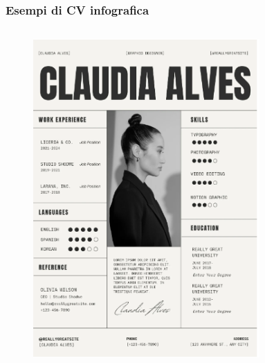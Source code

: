 \documentclass[handout]{beamer}
\begin{document}
\begin{frame}
\frametitle{Esempi di CV infografica}
\begin{columns}
  \begin{column}{.45\textwidth}
    \begin{figure}
      \includegraphics[width=\columnwidth]{img/cv5.png}
    \end{figure} 
  \end{column}
  \begin{column}{.45\textwidth}
    \begin{figure}

\end{figure}
\end{column}
\end{columns}
\end{frame}
\end{document}
